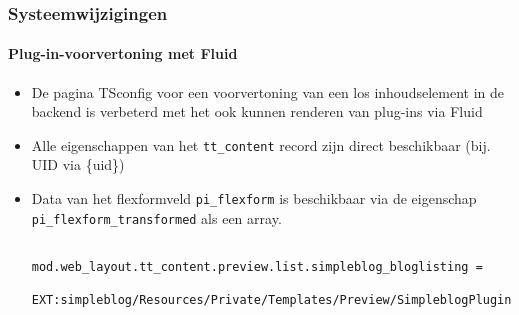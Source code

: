 \begin{frame}[fragile]
	\frametitle{Systeemwijzigingen}
	\framesubtitle{Plug-in-voorvertoning met Fluid}

	\lstset{basicstyle=\tiny\ttfamily}

	\begin{itemize}
		\item De pagina TSconfig voor een voorvertoning van een los inhoudselement in de backend is verbeterd
		 	met het ook kunnen renderen van plug-ins via Fluid

		\item Alle eigenschappen van het \texttt{tt\_content} record zijn direct beschikbaar (bij. UID via \{uid\})

		\item Data van het flexformveld \texttt{pi\_flexform} is beschikbaar via de eigenschap
			\texttt{pi\_flexform\_transformed} als een array.

			\begin{lstlisting}
				mod.web_layout.tt_content.preview.list.simpleblog_bloglisting =
				  EXT:simpleblog/Resources/Private/Templates/Preview/SimpleblogPlugin.html
			\end{lstlisting}

	\end{itemize}

\end{frame}


